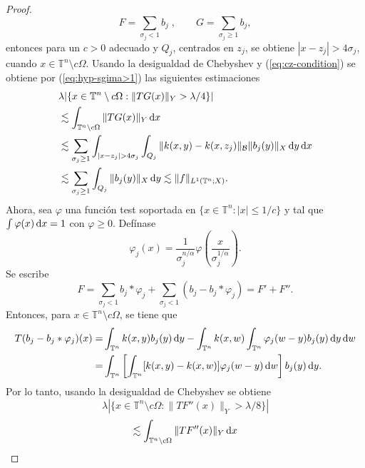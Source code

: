 \begin{proof}
\begin{equation*}
		F = \sum_{\sigma_j < 1} b_j\;, \quad  \quad G = \sum_{\sigma_j \geq 1}b_j,
	\end{equation*}
	entonces para un $c>0$ adecuado y $Q_j$, centrados en $z_j$, se obtiene $|x - z_j| > 4\sigma_j$, cuando $x \in \mathbb{T}^n \setminus c\Omega$. Usando la desigualdad de Chebyshev y (\ref{eq:cz-condition}) se obtiene por (\ref{eq:hyp-sgima>1}) las siguientes estimaciones
	\begin{align*}
		 & \lambda|\{ x \in \mathbb{T}^n \setminus c\Omega : \|TG(x)\|_Y > \lambda/4 \}| \\
		 &\lesssim \int_{\mathbb{T}^n \setminus c\Omega} \|TG(x)\|_Y \diff x \\
		 &\lesssim \sum_{\sigma_j \geq 1} \int_{|x-z_j|>4\sigma_j} \int_{Q_j} \|k(x, y) - k(x, z_j)\|_{\mathcal{B}}\|b_j(y)\|_X \diff y \diff x \\
		 &\lesssim \sum_{\sigma_j \geq 1} \int_{Q_j}\|b_j(y)\|_X \diff y \lesssim \|f\|_{L^1(\mathbb{T}^n; X)}.
	\end{align*}
	Ahora, sea $\varphi$ una función test soportada en $\{x \in \mathbb{T}^n : |x| \leq 1/c\}$ y tal que $\int\varphi(x) \mathop{}\!\mathrm{d} x = 1$ con $\varphi \geq 0$. Defínase
	\begin{equation*}
		\varphi_j(x) = \frac{1}{\sigma_j^{n/\alpha}} \varphi\left( \frac{x}{\sigma_j^{1/\alpha}} \right).
	\end{equation*}
	Se escribe
	\begin{equation*}
		F = \sum_{\sigma_j < 1}b_j *\varphi_j + \sum_{\sigma_j<1}(b_j - b_j * \varphi_j) = F' + F'' .
	\end{equation*}
	Entonces, para $x \in\mathbb{T}^n \setminus c\Omega $, se tiene que
	\begin{align*}
		T(b_j - b_j * \varphi_j)(x) = & \int_{\mathbb{T}^n}k(x, y)b_j(y)\mathop{}\!\mathrm{d} y - \int_{\mathbb{T}^n}k(x, w) \int_{\mathbb{T}^n} \varphi_j(w-y)b_j(y)\mathop{}\!\mathrm{d} y \mathop{}\!\mathrm{d} w \\
		= & \int_{\mathbb{T}^n}\left[\int_{\mathbb{T}^n}[k(x, y) - k(x, w)]\varphi_j(w-y)\mathop{}\!\mathrm{d} w\right] b_j(y)\mathop{}\!\mathrm{d} y.
	\end{align*}
	Por lo tanto, usando la desigualdad de Chebyshev se obtiene
	\begin{equation}
		\lambda |\{x \in \mathbb{T}^n \setminus c\Omega : \|TF''(x)\|_Y > \lambda/8\}|
		\label{eq:TF''}
	\end{equation}
	\begin{equation*}
		\lesssim \int_{\mathbb{T}^n \setminus c\Omega}\|TF''(x)\|_Y \mathop{}\!\mathrm{d} x
	\end{equation*}
	\begin{equation*}

\end{equation*}
\end{proof}

